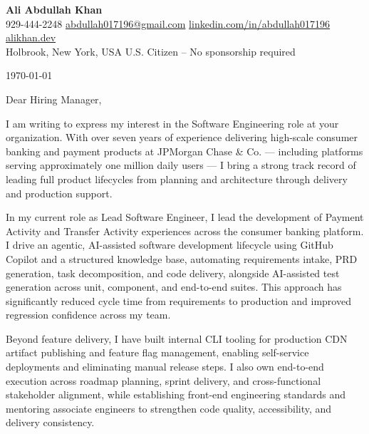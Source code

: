 \documentclass[letterpaper,11pt]{article}
\begin{document}
\begin{center}
    \textbf{\Large Ali Abdullah Khan} \\[4pt]
    \small
    929-444-2248 \textbar{}
    \href{mailto:abdullah017196@gmail.com}{abdullah017196@gmail.com} \textbar{}
    \href{https://www.linkedin.com/in/abdullah017196}{linkedin.com/in/abdullah017196} \textbar{}
    \href{https://alikhan.dev}{alikhan.dev} \\[2pt]
    Holbrook, New York, USA \textbar{} U.S. Citizen -- No sponsorship required
\end{center}

\vspace{20pt}

\today

\vspace{20pt}

Dear Hiring Manager,

\vspace{10pt}

I am writing to express my interest in the Software Engineering role at your organization. With over seven years of experience delivering high-scale consumer banking and payment products at JPMorgan Chase \& Co. --- including platforms serving approximately one million daily users --- I bring a strong track record of leading full product lifecycles from planning and architecture through delivery and production support.

\vspace{8pt}

In my current role as Lead Software Engineer, I lead the development of Payment Activity and Transfer Activity experiences across the consumer banking platform. I drive an agentic, AI-assisted software development lifecycle using GitHub Copilot and a structured knowledge base, automating requirements intake, PRD generation, task decomposition, and code delivery, alongside AI-assisted test generation across unit, component, and end-to-end suites. This approach has significantly reduced cycle time from requirements to production and improved regression confidence across my team.

\vspace{8pt}

Beyond feature delivery, I have built internal CLI tooling for production CDN artifact publishing and feature flag management, enabling self-service deployments and eliminating manual release steps. I also own end-to-end execution across roadmap planning, sprint delivery, and cross-functional stakeholder alignment, while establishing front-end engineering standards and mentoring associate engineers to strengthen code quality, accessibility, and delivery consistency.
\end{document}
